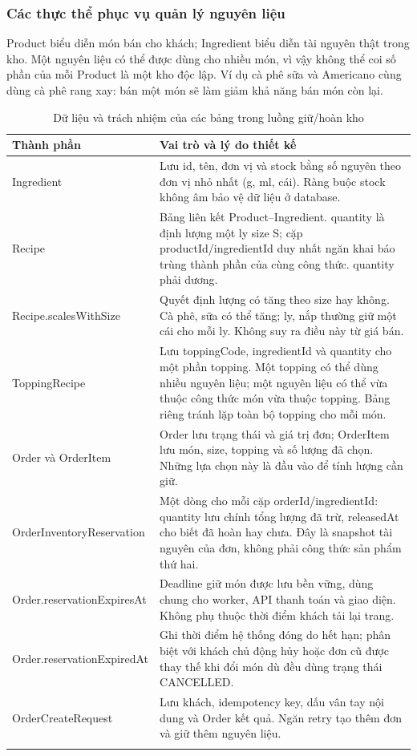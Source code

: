 \subsubsection{Các thực thể phục vụ quản lý nguyên liệu}
\label{sec:inventory-data}
Product biểu diễn món bán cho khách; Ingredient biểu diễn tài nguyên thật trong kho. Một nguyên liệu có thể được dùng cho nhiều món, vì vậy không thể coi số phần của mỗi Product là một kho độc lập. Ví dụ cà phê sữa và Americano cùng dùng cà phê rang xay: bán một món sẽ làm giảm khả năng bán món còn lại.

\begin{longtable}{|p{.33\linewidth}|p{.58\linewidth}|}
\hline\textbf{Thành phần} & \textbf{Vai trò và lý do thiết kế}\\\hline\endhead
Ingredient & Lưu id, tên, đơn vị và stock bằng số nguyên theo đơn vị nhỏ nhất (g, ml, cái). Ràng buộc stock không âm bảo vệ dữ liệu ở database.\\\hline
Recipe & Bảng liên kết Product--Ingredient. quantity là định lượng một ly size S; cặp productId/ingredientId duy nhất ngăn khai báo trùng thành phần của cùng công thức. quantity phải dương.\\\hline
Recipe.scalesWithSize & Quyết định lượng có tăng theo size hay không. Cà phê, sữa có thể tăng; ly, nắp thường giữ một cái cho mỗi ly. Không suy ra điều này từ giá bán.\\\hline
ToppingRecipe & Lưu toppingCode, ingredientId và quantity cho một phần topping. Một topping có thể dùng nhiều nguyên liệu; một nguyên liệu có thể vừa thuộc công thức món vừa thuộc topping. Bảng riêng tránh lặp toàn bộ topping cho mỗi món.\\\hline
Order và OrderItem & Order lưu trạng thái và giá trị đơn; OrderItem lưu món, size, topping và số lượng đã chọn. Những lựa chọn này là đầu vào để tính lượng cần giữ.\\\hline
OrderInventoryReservation & Một dòng cho mỗi cặp orderId/ingredientId: quantity lưu chính tổng lượng đã trừ, releasedAt cho biết đã hoàn hay chưa. Đây là snapshot tài nguyên của đơn, không phải công thức sản phẩm thứ hai.\\\hline
Order.reservationExpiresAt & Deadline giữ món được lưu bền vững, dùng chung cho worker, API thanh toán và giao diện. Không phụ thuộc thời điểm khách tải lại trang.\\\hline
Order.reservationExpiredAt & Ghi thời điểm hệ thống đóng do hết hạn; phân biệt với khách chủ động hủy hoặc đơn cũ được thay thế khi đổi món dù đều dùng trạng thái CANCELLED.\\\hline
OrderCreateRequest & Lưu khách, idempotency key, dấu vân tay nội dung và Order kết quả. Ngăn retry tạo thêm đơn và giữ thêm nguyên liệu.\\\hline
\caption{Dữ liệu và trách nhiệm của các bảng trong luồng giữ/hoàn kho}
\end{longtable}

